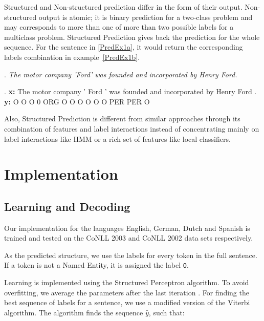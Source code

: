 \documentclass[11pt]{article}
\newcommand{\namedentity}{Named Entity}
\newcommand{\Oo}{\texttt O}
\begin{document}
Structured and  Non-structured prediction differ in the form of their output. 
Non-structured output is atomic; it is binary prediction for a two-class problem and may corresponds to more than one of more than two possible labels for a 
multiclass problem. 
Structured Prediction gives back the prediction for the whole sequence. 
For the sentence in \ref{PredEx1a}, it would return the corresponding labels combination in example~\ref{PredEx1b}. 

\begin{figure*}[ht]

\ex. \emph{The motor company 'Ford' was founded and incorporated  by Henry Ford.} \label{PredEx1a}
 
\exg. \textbf{x:} The motor company ' Ford ' was founded and incorporated by Henry Ford .\\
      \textbf{y:}  O   O      O     0 ORG  O  O     O     O       O        O PER   PER  O  \label{PredEx1b} \\
\caption{Input and predicted structure for the \namedentity task.}

\end{figure*}

Also, Structured Prediction is different from similar approaches through its combination of features and label interactions instead
of concentrating mainly on label interactions like HMM or a rich set of features like local classifiers. 

\section{Implementation}

\subsection{Learning and Decoding}

Our implementation for the languages English, German, Dutch and Spanish is trained and tested on the CoNLL 2003 and CoNLL 2002 data sets respectively. 

As the predicted structure, we use the labels for every token in the full sentence. If a token is not a \namedentity, it is assigned the label \Oo.

Learning is implemented using the Structured Perceptron algorithm. To avoid overfitting, we average the parameters after the last iteration \cite{collins2002discriminative}. For finding the best sequence of labels for a sentence, we use a modified version of the Viterbi algorithm. The algorithm finds the sequence $\hat{y}$, such that:
\end{document}
